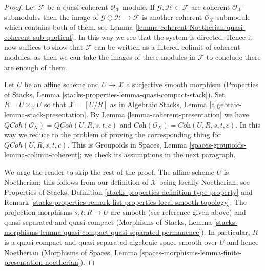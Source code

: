 \documentclass[10pt,a4paper]{amsart}
\theoremstyle{plain}
\theoremstyle{definition}
\theoremstyle{remark}
\numberwithin{equation}{subsection}
\def\QCoh{\mathit{QCoh}}
\begin{document}
\begin{proof}
Let $\mathcal{F}$ be a quasi-coherent $\mathcal{O}_\mathcal{X}$-module.
If $\mathcal{G}, \mathcal{H} \subset \mathcal{F}$ are coherent
$\mathcal{O}_\mathcal{X}$-submodules then the image of
$\mathcal{G} \oplus \mathcal{H} \to \mathcal{F}$ is another
coherent $\mathcal{O}_\mathcal{X}$-submodule which contains both of them,
see Lemma \ref{lemma-coherent-Noetherian-quasi-coherent-sub-quotient}.
In this way we see that the system is directed.
Hence it now suffices to show that $\mathcal{F}$ can be written as
a filtered colimit of coherent modules, as then we can take the
images of these modules in $\mathcal{F}$ to conclude there are
enough of them.

\medskip\noindent
Let $U$ be an affine scheme and $U \to \mathcal{X}$
a surjective smooth morphism (Properties of Stacks, Lemma
\ref{stacks-properties-lemma-quasi-compact-stack}).
Set $R = U \times_\mathcal{X} U$ so that $\mathcal{X} = [U/R]$
as in Algebraic Stacks, Lemma \ref{algebraic-lemma-stack-presentation}.
By Lemma \ref{lemma-coherent-presentation} we have
$\QCoh(\mathcal{O}_X) = \QCoh(U, R, s, t, c)$ and
$\textit{Coh}(\mathcal{O}_X) = \textit{Coh}(U, R, s, t, c)$.
In this way we reduce to the problem of proving the corresponding thing for
$\QCoh(U, R, s, t, c)$. This is
Groupoids in Spaces, Lemma \ref{spaces-groupoids-lemma-colimit-coherent};
we check its assumptions in the next paragraph.

\medskip\noindent
We urge the reader to skip the rest of the proof.
The affine scheme $U$ is Noetherian; this follows from our definition
of $\mathcal{X}$ being locally Noetherian, see
Properties of Stacks, Definition
\ref{stacks-properties-definition-type-property} and
Remark \ref{stacks-properties-remark-list-properties-local-smooth-topology}.
The projection morphisms $s, t : R \to U$ are smooth (see reference
given above)
and quasi-separated and quasi-compact (Morphisms of Stacks, Lemma
\ref{stacks-morphisms-lemma-quasi-compact-quasi-separated-permanence}).
In particular, $R$ is a quasi-compact and quasi-separated algebraic space
smooth over $U$ and hence Noetherian
(Morphisms of Spaces, Lemma
\ref{spaces-morphisms-lemma-finite-presentation-noetherian}).
\end{proof}
\end{document}
